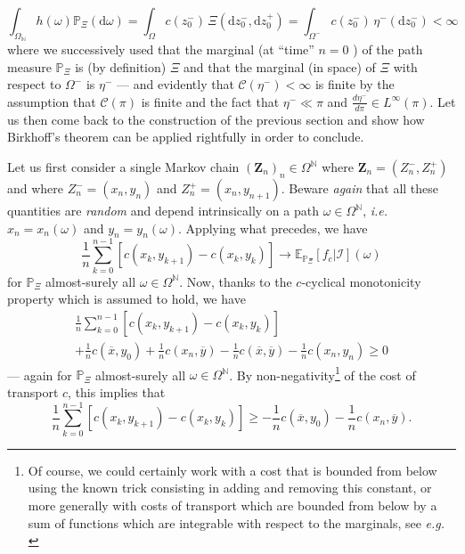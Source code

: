 \documentclass[leqno, 11pt, a4paper]{amsart}
\theoremstyle{definition}
\newcommand{\cZ}{\mathbf{Z}}
\newcommand{\C}{\mathscr{C}}
\newcommand{\E}{\mathbb{E}}
\newcommand{\N}{\mathbb{N}}
\newcommand{\Pro}{\mathbb{P}}
\newcommand{\ox}{\overline{x}}
\newcommand{\oy}{\overline{y}}
\newcommand{\dd}{\mathrm{d}}
\begin{document}
	$$
	\int_{\Omega_\N} h(\omega)  \Pro_\Xi(\dd \omega) = \int_{\Omega} c(z_0^-) \,  \Xi(\dd z_0^-, \dd z_0^+) = \int_{\Omega^-} c(z^-_0)\,  \eta^-(\dd z^-_0) < \infty
	$$
	where we successively used that the marginal (at ``time'' $n = 0$ ) of the path measure $\Pro_\Xi$ is (by definition) $\Xi$ and that the marginal (in space) of $\Xi$ with respect to $\Omega^-$ is $\eta^-$ --- and evidently that $\C(\eta^-) < \infty$ is finite by the assumption that $\C(\pi)$ is finite and the fact that $\eta^- \ll \pi$ and $\frac{d\eta^-}{d\pi} \in L^\infty(\pi)$. Let us then come back to the construction of the previous section and show how Birkhoff's theorem can be applied rightfully in order to conclude. 
	
	Let us first consider a single Markov chain $(\cZ_n)_n \in \Omega^\N$ where $\cZ_n = (Z_n^-, Z_n^+)$ and where $Z_n^- = (x_n, y_n)$ and $Z_n^+ = (x_n, y_{n+1})$. Beware \textit{again} that all these quantities are \textit{random} and depend intrinsically on a path $\omega \in \Omega^\N$, \textit{i.e.} $x_n = x_n(\omega)$ and $y_n = y_n(\omega)$. Applying what precedes, we have
	$$
	\frac{1}{n} \sum_{k= 0}^{n-1} [c(x_{k}, y_{k+1}) - c(x_{k}, y_{k})] \to \E_{\Pro_\Xi}[f_c | \mathcal{I}](\omega)
	$$
	for $\Pro_\Xi$ almost-surely all $\omega \in \Omega^\N$. Now, thanks to the $c$-cyclical monotonicity property which is assumed to hold, we have 
\begin{multline*}
   \frac1n \sum_{k = 0}^{n-1} [c(x_{k}, y_{k+1}) - c(x_{k}, y_{k})] \\+ \frac1nc(\ox, y_{0}) + \frac1n c(x_{n}, \oy) - \frac1nc(\ox, \oy) - \frac1n c(x_{n}, y_n) \geq0  
\end{multline*}
--- again for $\Pro_\Xi$ almost-surely all $\omega \in \Omega^\N$. By non-negativity\footnote{\label{fn:theonlyone} Of course, we could certainly work with a cost that is bounded from below using the known trick consisting in adding and removing this constant, or more generally with costs of transport which are bounded from below by a sum of functions which are integrable with respect to the marginals, see \textit{e.g.} \cite[Theorem 4.1]{villani_optimal_2009}} of the cost of transport $c$, this implies that
\begin{equation}\label{eq:eq}
\frac1n \sum_{k = 0}^{n-1} [c(x_{k}, y_{k+1}) - c(x_{k}, y_{k})]  \geq - \frac1nc(\ox, y_{0}) - \frac1n c(x_{n}, \oy).
\end{equation}
\end{document}
